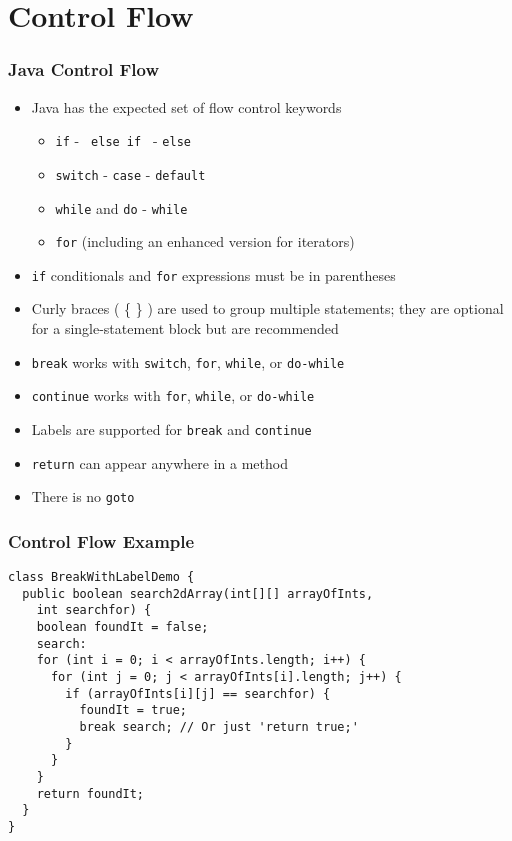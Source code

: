 \documentclass{beamer}
\begin{document}
\section{Control Flow}
\begin{frame}
\frametitle{Java Control Flow}
\begin{itemize}
\item Java has the expected set of flow control keywords
\begin{itemize}
\item \texttt{if} - \texttt{ else if } - \texttt{else}
\item \texttt{switch} - \texttt{case} - \texttt{default}
\item \texttt{while} and \texttt{do} - \texttt{while}
\item \texttt{for} (including an enhanced version for iterators)
\end{itemize}
\item \texttt{if} conditionals and \texttt{for} expressions must be in parentheses
\item Curly braces ( \{ \} ) are used to group multiple statements; they are optional for a single-statement block but are recommended
\item \texttt{break} works with \texttt{switch}, \texttt{for}, \texttt{while}, or \texttt{do-while}
\item \texttt{continue} works with \texttt{for}, \texttt{while}, or \texttt{do-while}
\item Labels are supported for \texttt{break} and \texttt{continue}
\item \texttt{return} can appear anywhere in a method
\item There is no \texttt{goto}
\end{itemize}
\end{frame}

\begin{frame}[fragile]
\frametitle{Control Flow Example}
\lstset{language=Java}
\begin{lstlisting}
class BreakWithLabelDemo {
  public boolean search2dArray(int[][] arrayOfInts, 
    int searchfor) {
    boolean foundIt = false;
    search:
    for (int i = 0; i < arrayOfInts.length; i++) {
      for (int j = 0; j < arrayOfInts[i].length; j++) {
        if (arrayOfInts[i][j] == searchfor) {
          foundIt = true;
          break search; // Or just 'return true;'
        }
      }
    }
    return foundIt;
  }
}
\end{lstlisting}
\end{frame}
\end{document}
